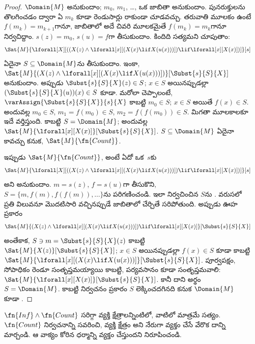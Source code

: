 \documentclass[../../../include/open-logic-section]{subfiles}
\begin{document}
\begin{proof}
$\Domain{M}$  అనుకుందాం; $m_0$, $m_1$, \dots,
ఒక జాబితా అనుకుందాం. పునరుక్తులను తొలగించడం ద్వారా ఏ $m_k$ కూడా
రెండుసార్లు రాకుండా చూడవచ్చు. తరువాతి మూలకం ఉంటే $f(m_k) = m_{k+1}$గానూ,
జాబితాలో అదే చివరి మూలకమైతే $f(m_k) = m_k$గానూ నిర్వచిద్దాం.
$s(z) = m_0$, $s(u) = f$గా తీసుకుందాం. కిందిది
సత్యమని చూపుతాం:
\[
\Sat{M}{\lforall[X][((X(z) \land \lforall[x][(X(x) \lif X(u(x)))])
    \lif \lforall[x][X(x)])]}[s]
\]
ఏదైనా $S \subseteq \Domain{M}$ను తీసుకుందాం. ఇంకా,
$\Sat{M}{(X(z) \land \lforall[x][(X(x) \lif
X(u(x)))])}[\Subst{s}{S}{X}]$ అనుకుందాం. అప్పుడు
$\Subst{s}{S}{X}(z) \in S$; $x \in S$ అయినప్పుడల్లా
$(\Subst{s}{S}{X}(u))(x) \in S$ కూడా. మరోలా చెప్పాలంటే,
$\varAssign{\Subst{s}{S}{X}}{s}{X}$ కాబట్టి $m_0 \in S$; $x \in S$
అయితే $f(x) \in S$. అందువల్ల $m_0 \in S$, $m_1 = f(m_0) \in S$,
$m_2 = f(f(m_0)) \in S$. మిగతా మూలకాలకూ ఇదే వర్తిస్తుంది. కాబట్టి
$S = \Domain{M}$; అందువల్ల
$\Sat{M}{\lforall[x][X(x)]}[\Subst{s}{S}{X}]$. $S \subseteq
\Domain{M}$ ఏదైనా కావచ్చు కనుక,
$\Sat{M}{\fn{Count}}$.

ఇప్పుడు $\Sat{M}{\fn{Count}}$, అంటే ఏదో ఒక~$s$కు
\[
\Sat{M}{\lforall[X][((X(z) \land \lforall[x][(X(x) \lif X(u(x)))])
    \lif \lforall[x][X(x)])]}[s]
\]
అని అనుకుందాం. $m = s(z)$, $f = s(u)$గా తీసుకొని,
$S = \{m, f(m), f(f(m)), \dots\}$ను పరిగణించండి. ఇలా నిర్వచించిన
$S$ను . వరుసలో ప్రతి విలువనూ
మొదటిసారి వచ్చినప్పుడే జాబితాలో చేర్చితే సరిపోతుంది. అప్పుడు ఊహ ప్రకారం
\[
\Sat{M}{(X(z) \land \lforall[x][(X(x) \lif X(u(x)))])
    \lif \lforall[x][X(x)]}[\Subst{s}{S}{X}]
\]
అంతేకాక, $S \ni m = \Subst{s}{S}{X}(z)$ కాబట్టి
$\Sat{M}{X(z)}[\Subst{s}{S}{X}]$; $x \in S$ అయినప్పుడల్లా
$f(x) \in S$ కూడా కాబట్టి
$\Sat{M}{\lforall[x][(X(x) \lif
X(u(x))) ]}[\Subst{s}{S}{X}]$. పూర్వపక్షం, సోపాధికం రెండూ
సంతృప్తమయ్యాయి కాబట్టి, పర్యవసానం కూడా సంతృప్తమవాలి:
$\Sat{M}{\lforall[x][X(x)]}[\Subst{s}{S}{X}]$. కానీ దాని అర్థం
$S = \Domain{M}$. కాబట్టి నిర్వచనం ప్రకారం $S$ లెక్కించదగినది కనుక
$\Domain{M}$ కూడా .
\end{proof}

\begin{prob}
 $\fn{Inf} \land \fn{Count}$ సరిగ్గా
 వ్యక్తి క్షేత్రాలన్నింటిలో, వాటిలో మాత్రమే
సత్యం. $\fn{Count}$ నిర్వచనాన్ని సవరించి, వ్యక్తి క్షేత్రం
 అని నేరుగా వ్యక్తం చేసే వేరొక
 దాన్ని మార్చండి. ఆ వాక్యం కోరిన ధర్మాన్ని వ్యక్తం చేస్తుందని నిరూపించండి.
\end{prob}
\end{document}
